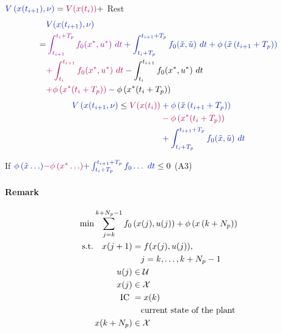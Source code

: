 ${\colBlue V \paren{ x(t_{i+1}), \nu } }
= {\colRed V( x(t_i) )} + $ Rest
{
\scriptsize
\begin{align*}
      &
      \colBlue{}
      V(x(t_{i+1}), \nu)\\
    = & 
    \colBlue{}
    {
    \colPurple{}
    \intdt{t_{i+1}}{t_i+T_p}{f_0(x^*,u^*)}
    }
    +
    \intdt{t_i+T_p}{t_{i+1}+T_p}{f_0(\tilde{x},\tilde{u})}
    + \phi \paren{ \tilde{x} \paren{ t_{i+1} + T_p } }\\
    & {
        \colRed +\intdt{t_i}{t_{i+1}}{f_0 (x^*,u^*)}
        }
        - \intdt{t_i}{t_{i+1}}{f_0 (x^*,u^*)}\\
    & {
        \colRed +
        \phi \paren{ x^*(t_i + T_p) }
        }
        - \phi \paren{ x^*(t_i + T_p) }
\end{align*}
}%
%
\begin{align*}
    { \colBlue V\paren{ x(t_{i+1}, \nu} }
    \leq
    \colRed V(x(t_i))
        & \colBlue + \phi \paren{ \tilde{x} \paren{ t_{i+1} + T_p } }\\
        & \colRed - \phi \paren{ x^*(t_i + T_p) }\\
        & \colBlue + \intdt{t_i+T_p}{t_{i+1}+T_p}{f_0(\tilde{x},\tilde{u})}
\end{align*}

If
${\colBlue \phi \paren{ \tilde{x}  \dots } }
{ \colRed - \phi \paren{ x^* \dots } }
{ \colBlue + \intdt{t_i+T_p}{t_{i+1}+T_p}{f_0 \dots } } \leq 0$ (A3)

\paragraph{Remark}
\begin{gather*}
    \begin{align*}
        \min \sumk{j=k}{k+N_p-1}
        f_0 \paren{ x(j), u(j) }
        + \phi \paren{ x \paren{ k + N_p } }
    \end{align*}\\
    \begin{align*}
        \st{} \quad
        x(j+1) &= f( x(j), u(j)),\\
        &\quad j = k, \dots, k + N_p - 1\\
        u(j) &\in \setU{}\\
        x(j) &\in \setX{}\\
        \txt{IC } &= x(k)\\
        &\quad \txt{current state of the plant}\\
        x(k+N_p) &\in \setX{}
    \end{align*}
\end{gather*}

